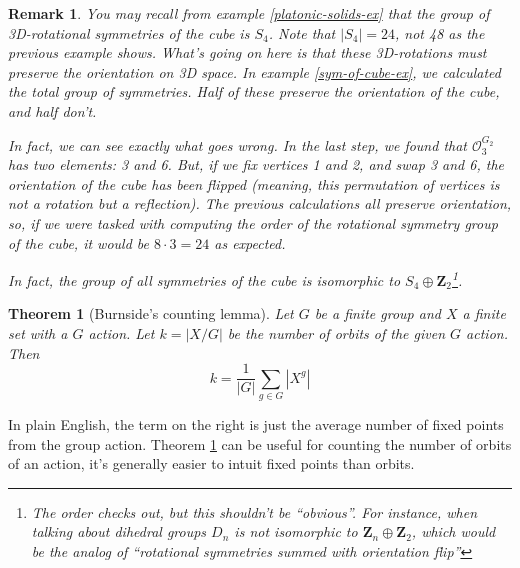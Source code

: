 \documentclass[12pt]{article}
\numberwithin{equation}{subsection}
\newtheorem{thm}[subsection]{Theorem}
\theoremstyle{note}
\newtheorem{remark}[subsection]{Remark}
\begin{document}
\begin{remark}
You may recall from example \ref{platonic-solids-ex} that the group of 3D-rotational symmetries of the cube is $S_4$. Note that $|S_4|=24$, not 48 as the previous example shows. What's going on here is that these 3D-rotations must preserve the orientation on 3D space. In example \ref{sym-of-cube-ex}, we calculated the total group of symmetries. Half of these preserve the orientation of the cube, and half don't. 

In fact, we can see exactly what goes wrong. In the last step, we found that $\mathcal{O}_3^{G_2}$ has two elements: 3 and 6. But, if we fix vertices 1 and 2, and swap 3 and 6, the orientation of the cube has been flipped (meaning, this permutation of vertices is not a rotation but a reflection). The previous calculations all preserve orientation, so, if we were tasked with computing the order of the rotational symmetry group of the cube, it would be $8\cdot3=24$ as expected. 

In fact, the group of all symmetries of the cube is isomorphic to $S_4\oplus \mathbf{Z}_2$\footnote{The order checks out, but this shouldn't be ``obvious''. For instance, when talking about dihedral groups $D_n$ is not isomorphic to $\mathbf{Z}_n\oplus \mathbf{Z}_2$, which would be the analog of ``rotational symmetries summed with orientation flip''}.

\end{remark}


\begin{thm}[Burnside's counting lemma] \label{BS-lem} Let $G$ be a finite group and $X$ a finite set with a $G$ action. Let $k=|X/G|$ be the number of orbits of the given $G$ action. Then \begin{equation} 
	k = \dfrac{1}{|G|} \sum_{g\in G} |X^g|
\end{equation}
\end{thm}

In plain English, the term on the right is just the average number of fixed points from the group action. Theorem \ref{BS-lem} can be useful for counting the number of orbits of an action, it's generally easier to intuit fixed points than orbits. 
\end{document}
